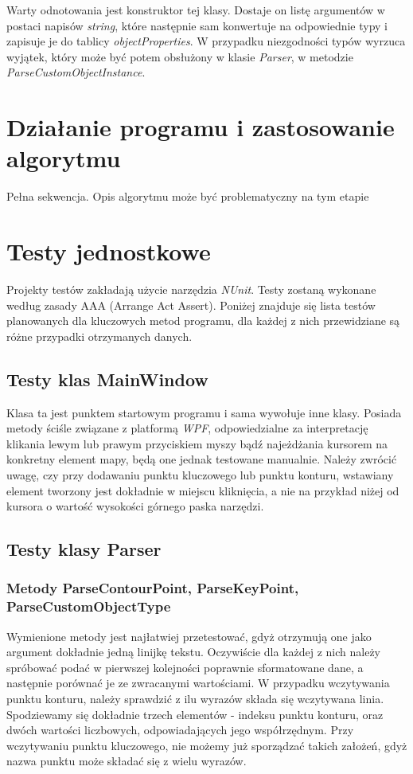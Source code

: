 \documentclass[a4paper,11pt]{article}
\newcommand\tab[1][0.6cm]{\hspace*{#1}}
\begin{document}
Warty odnotowania jest konstruktor tej klasy. Dostaje on listę argumentów w postaci napisów \textit{string}, które następnie sam konwertuje na odpowiednie typy i zapisuje je do tablicy \textit{objectProperties}. W przypadku niezgodności typów wyrzuca wyjątek, który może być potem obsłużony w klasie \textit{Parser}, w metodzie \textit{ParseCustomObjectInstance}.

\section{Działanie programu i zastosowanie algorytmu}

\tab Pełna sekwencja. Opis algorytmu może być problematyczny na tym etapie

\section{Testy jednostkowe}

\tab Projekty testów zakładają użycie narzędzia \textit{NUnit}. Testy zostaną wykonane według zasady AAA (Arrange Act Assert). Poniżej znajduje się lista testów planowanych dla kluczowych metod programu, dla każdej z nich przewidziane są różne przypadki otrzymanych danych. 

\subsection{Testy klas MainWindow}

\tab Klasa ta jest punktem startowym programu i sama wywołuje inne klasy. Posiada metody ściśle związane z platformą \textit{WPF}, odpowiedzialne za interpretację klikania lewym lub prawym przyciskiem myszy bądź najeżdżania kursorem na konkretny element mapy, będą one jednak testowane manualnie. Należy zwrócić uwagę, czy przy dodawaniu punktu kluczowego lub punktu konturu, wstawiany element tworzony jest dokładnie w miejscu kliknięcia, a nie na przykład niżej od kursora o wartość wysokości górnego paska narzędzi.

\subsection{Testy klasy Parser}

\subsubsection{Metody ParseContourPoint, ParseKeyPoint, ParseCustomObjectType}
\tab Wymienione metody jest najłatwiej przetestować, gdyż otrzymują one jako argument dokładnie jedną linijkę tekstu. Oczywiście dla każdej z nich należy spróbować podać w pierwszej kolejności poprawnie sformatowane dane, a następnie porównać je ze zwracanymi wartościami. W przypadku wczytywania punktu konturu, należy sprawdzić z ilu wyrazów składa się wczytywana linia. Spodziewamy się dokładnie trzech elementów - indeksu punktu konturu, oraz dwóch wartości liczbowych, odpowiadających jego współrzędnym. Przy wczytywaniu punktu kluczowego, nie możemy już sporządzać takich założeń, gdyż nazwa punktu może składać się z wielu wyrazów. 
\end{document}
